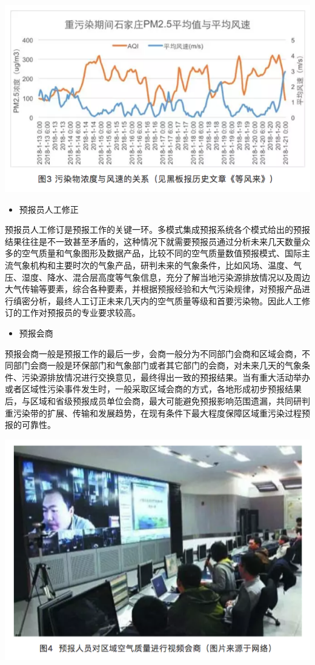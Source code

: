 \documentclass[]{book}
\providecommand{\tightlist}{%
  \setlength{\itemsep}{0pt}\setlength{\parskip}{0pt}}
\begin{document}
\includegraphics[width=8.33in]{images/kqyb3}

\begin{itemize}
\tightlist
\item
  预报员人工修正
\end{itemize}

预报员人工修订是预报工作的关键一环。多模式集成预报系统各个模式给出的预报结果往往是不一致甚至矛盾的，这种情况下就需要预报员通过分析未来几天数量众多的空气质量和气象图形及数据产品，比较不同的空气质量数值预报模式、国际主流气象机构和主要时次的气象产品，研判未来的气象条件，比如风场、温度、气压、湿度、降水、混合层高度等气象信息，充分了解当地污染源排放情况以及周边大气传输等要素，综合各种要素，并根据预报经验和大气污染规律，对预报产品进行缜密分析，最终人工订正未来几天内的空气质量等级和首要污染物。因此人工修订的工作对预报员的专业要求较高。

\begin{itemize}
\tightlist
\item
  预报会商
\end{itemize}

预报会商一般是预报工作的最后一步，会商一般分为不同部门会商和区域会商，不同部门会商一般是环保部门和气象部门或者其它部门的会商，对未来几天的气象条件、污染源排放情况进行交换意见，最终得出一致的预报结果。当有重大活动举办或者区域性污染事件发生时，一般采取区域会商的方式，各地形成初步预报结果后，与区域和省级预报成员单位会商，最大可能避免预报影响范围遗漏，共同研判重污染带的扩展、传输和发展趋势，在现有条件下最大程度保障区域重污染过程预报的可靠性。

\includegraphics[width=8.33in]{images/kqyb4}
\end{document}
